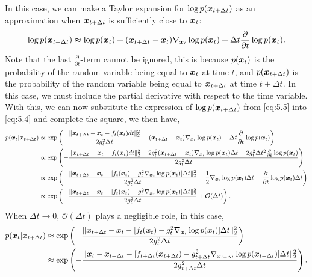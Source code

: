In this case, we can make a Taylor expansion for $\log p(\bm{x}_{t+\Delta t})$ as an approximation when $\bm{x}_{t+\Delta t}$ is sufficiently close to $\bm{x}_t$:
\begin{equation}
    \label{eq:5.5}
    \log p(\bm{x}_{t+\Delta t})\approx \log p(\bm{x}_t)+ (\bm{x}_{t+\Delta t}-\bm{x}_t)\nabla _{\bm{x}_t}\log p(\bm{x}_t)+ \Delta t\frac{\partial}{\partial t}\log p(\bm{x}_t).
\end{equation}
Note that the last $\frac{\partial}{\partial t}$-term cannot be ignored, this is because $p(\bm{x}_t)$ is the probability of the random variable being equal to $\bm{x}_t$ at time $t$, and $p(\bm{x}_{t+\Delta t})$ is the probability of the random variable being equal to $\bm{x}_{t+\Delta t}$ at time $t+\Delta t$. In this case, we must include the partial derivative with respect to the time variable. With this, we can now substitute the expression of $\log p(\bm{x}_{t+\Delta t})$ from \cref{eq:5.5} into \cref{eq:5.4} and complete the square, we then have,
\begin{align}
    p(\bm{x}_{t}|\bm{x}_{t+\Delta t}) &\propto \exp \left(  -\frac{\| \bm{x}_{t+\Delta t}-\bm{x}_{t}-f_t(\bm{x}_{t})dt\|_2^2}{2g_t^2\Delta t} -  (\bm{x}_{t+\Delta t}-\bm{x}_t)\nabla _{\bm{x}_t}\log p(\bm{x}_t)-\Delta t\frac{\partial}{\partial t}\log p(\bm{x}_t) \right)  \nonumber\\
    &\propto \exp\left(-\frac{\| \bm{x}_{t+\Delta t}-\bm{x}_{t}-f_t(\bm{x}_{t})dt\|_2^2-2g_t^2(\bm{x}_{t+\Delta t}-\bm{x}_t)\nabla _{\bm{x}_t}\log p(\bm{x}_t)\Delta t-2g_t^2\Delta t^2 \frac{\partial}{\partial t}\log p(\bm{x}_{t})  }{2g_t^2\Delta t}\right)  \nonumber \\
    &\propto\exp\left(-\frac{\| \bm{x}_{t+\Delta t}-\bm{x}_{t}-[f_t(\bm{x}_{t})-g_t^2 \nabla_{\bm{x}_{t}} \log p(\bm{x}_{t})]\Delta t\|_2^2}{2g_t^2\Delta t} -\frac{1}{2}\nabla_{\bm{x}_{t}}\log p(\bm{x}_{t})\Delta t+\frac{\partial}{\partial t}\log p(\bm{x}_{t})\Delta t  \right)\nonumber\\
    &\propto \exp\left(-\frac{\| \bm{x}_{t+\Delta t}-\bm{x}_{t}-[f_t(\bm{x}_{t})-g_t^2 \nabla_{\bm{x}_{t}} \log p(\bm{x}_{t})]\Delta t\|_2^2}{2g_t^2\Delta t}+\mathcal{O}(\Delta t)\right). \label{eq:5.6}
\end{align}
When $\Delta t\to 0$, $\mathcal{O}(\Delta t)$ plays a negligible role, in this case,
\begin{align}
    p(\bm{x}_{t}|\bm{x}_{t+\Delta t}) &\approx  \exp\left(-\frac{\| \bm{x}_{t+\Delta t}-\bm{x}_{t}-[f_t(\bm{x}_{t})-g_t^2 \nabla_{\bm{x}_{t}} \log p(\bm{x}_{t})]\Delta t\|_2^2}{2g_t^2\Delta t}\right) \nonumber\\
    &\approx \exp\left(-\frac{\|\bm{x}_{t}- \bm{x}_{t+\Delta t}-[f_{t+\Delta t}(\bm{x}_{t+\Delta t})-g_{t+\Delta t}^2 \nabla_{\bm{x}_{t+\Delta t}} \log p(\bm{x}_{t+\Delta t})]\Delta t\|_2^2}{2g_{t+\Delta t}^2\Delta t}\right).\label{eq:5.7}
\end{align}
